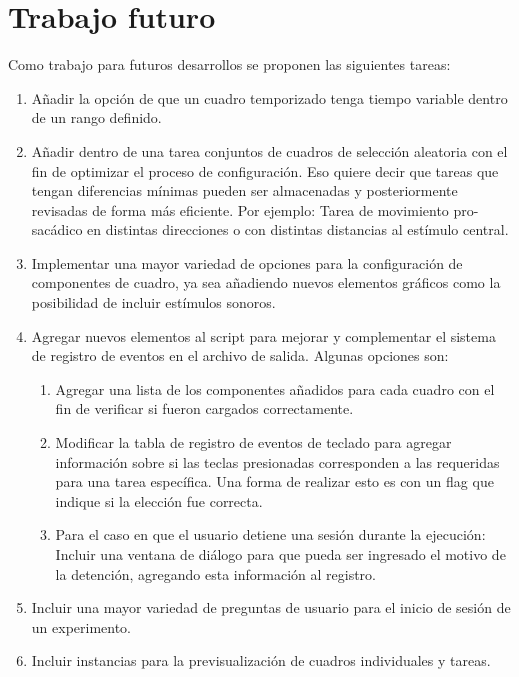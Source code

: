\documentclass[\main/main.tex]{subfiles}
\begin{document}
	\section{Trabajo futuro}
	\label{sec:05_trabajo_futuro}
		Como trabajo para futuros desarrollos se proponen las siguientes tareas:
		\begin{enumerate}\setlength\itemsep{-0.2em}
			\item Añadir la opción de que un cuadro temporizado tenga tiempo variable dentro de un rango definido.

			\item Añadir dentro de una tarea conjuntos de cuadros de selección aleatoria con el fin de optimizar el proceso de configuración. Eso quiere decir que tareas que tengan diferencias mínimas pueden ser almacenadas y posteriormente revisadas de forma más eficiente. Por ejemplo: Tarea de movimiento pro-sacádico en distintas direcciones o con distintas distancias al estímulo central.  

			\item Implementar una mayor variedad de opciones para la configuración de componentes de cuadro, ya sea añadiendo nuevos elementos gráficos como la posibilidad de incluir estímulos sonoros.  

			\item Agregar nuevos elementos al script para mejorar y complementar el sistema de registro de eventos en el archivo de salida. Algunas opciones son:
				\begin{enumerate}\setlength\itemsep{-0.2em}
					\item Agregar una lista de los componentes añadidos para cada cuadro con el fin de verificar si fueron cargados correctamente.

					\item Modificar la tabla de registro de eventos de teclado para agregar información sobre si las teclas presionadas corresponden a las requeridas para una tarea específica. Una forma de realizar esto es con un flag que indique si la elección fue correcta. 

					\item Para el caso en que el usuario detiene una sesión durante la ejecución: Incluir una ventana de diálogo para que pueda ser ingresado el motivo de la detención, agregando esta información al registro. 

				\end{enumerate}

			\item Incluir una mayor variedad de preguntas de usuario para el inicio de sesión de un experimento. 

			\item Incluir instancias para la previsualización de cuadros individuales y tareas.

		\end{enumerate}
	
\end{document}
